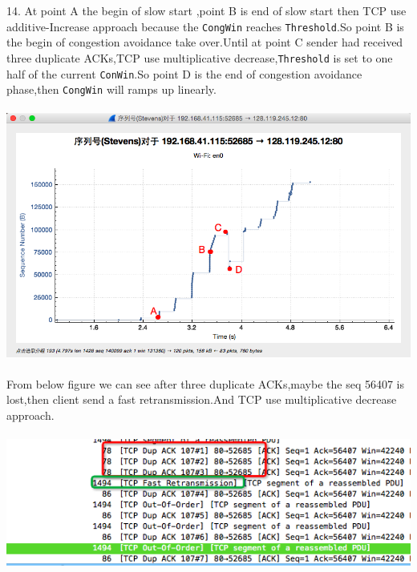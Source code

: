 \documentclass[a4paper]{article}
\begin{document}
{	14. At point A the begin of slow start ,point B is end of slow start then TCP use additive-Increase approach because the \verb|CongWin| reaches \verb|Threshold|.So point B is the begin of congestion avoidance take over.Until at point C sender had received three duplicate ACKs,TCP use multiplicative decrease,\verb|Threshold| is set to one half of the current \verb|ConWin|.So point D is the end of congestion avoidance phase,then \verb|CongWin| will ramps up linearly.\\\\ 
	{\centering\includegraphics[scale=0.5]{Illustrations/13_2.png}}\\\\
	From below figure we can see after three duplicate ACKs,maybe the seq 56407 is lost,then client send a fast retransmission.And TCP use multiplicative decrease 
	approach.		\\\\
	{\centering\includegraphics[scale=0.5]{Illustrations/13_1.png}}\\\\

}

\end{document}
